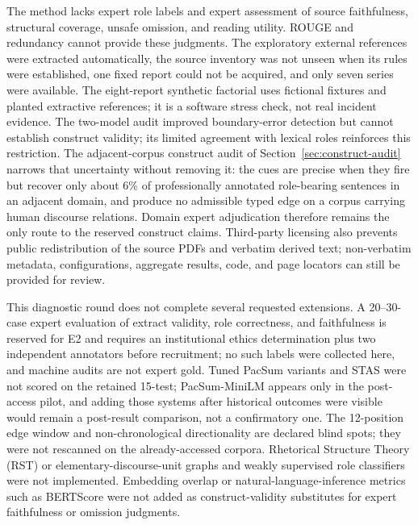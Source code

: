 \documentclass[information,article,submit,moreauthors]{Definitions/mdpi}
\begin{document}
The method lacks expert role labels and expert assessment of source faithfulness, structural coverage, unsafe omission, and reading utility. ROUGE and redundancy cannot provide these judgments. The exploratory external references were extracted automatically, the source inventory was not unseen when its rules were established, one fixed report could not be acquired, and only seven series were available. The eight-report synthetic factorial uses fictional fixtures and planted extractive references; it is a software stress check, not real incident evidence. The two-model audit improved boundary-error detection but cannot establish construct validity; its limited agreement with lexical roles reinforces this restriction. The adjacent-corpus construct audit of Section~\ref{sec:construct-audit} narrows that uncertainty without removing it: the cues are precise when they fire but recover only about 6\% of professionally annotated role-bearing sentences in an adjacent domain, and produce no admissible typed edge on a corpus carrying human discourse relations. Domain expert adjudication therefore remains the only route to the reserved construct claims. Third-party licensing also prevents public redistribution of the source PDFs and verbatim derived text; non-verbatim metadata, configurations, aggregate results, code, and page locators can still be provided for review.

This diagnostic round does not complete several requested extensions. A 20--30-case expert evaluation of extract validity, role correctness, and faithfulness is reserved for E2 and requires an institutional ethics determination plus two independent annotators before recruitment; no such labels were collected here, and machine audits are not expert gold. Tuned PacSum variants and STAS were not scored on the retained 15-test; PacSum-MiniLM appears only in the post-access pilot, and adding those systems after historical outcomes were visible would remain a post-result comparison, not a confirmatory one. The 12-position edge window and non-chronological directionality are declared blind spots; they were not rescanned on the already-accessed corpora. Rhetorical Structure Theory (RST) or elementary-discourse-unit graphs and weakly supervised role classifiers were not implemented. Embedding overlap or natural-language-inference metrics such as BERTScore were not added as construct-validity substitutes for expert faithfulness or omission judgments.
\end{document}
